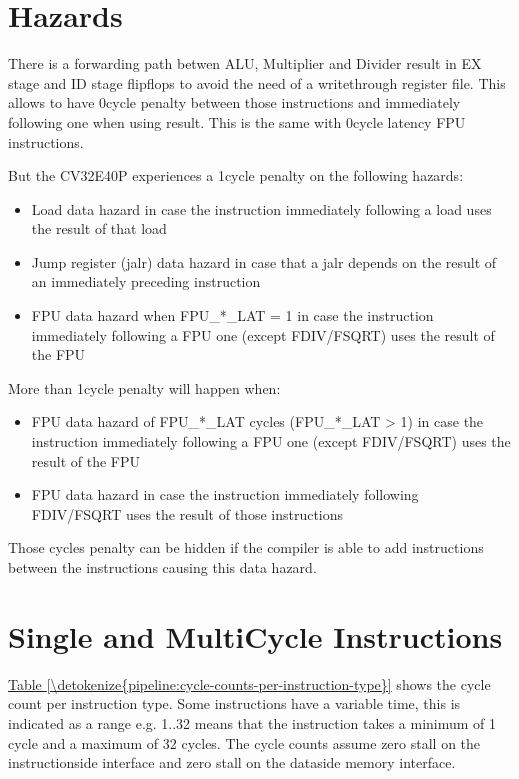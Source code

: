 \documentclass[letterpaper,10pt,english]{sphinxmanual}
\begin{document}
\section{Hazards}
\label{\detokenize{pipeline:hazards}}
\sphinxAtStartPar
There is a forwarding path betwen ALU, Multiplier and Divider result in EX stage and ID stage flip\sphinxhyphen{}flops to avoid the need of a write\sphinxhyphen{}through register file.
This allows to have 0\sphinxhyphen{}cycle penalty between those instructions and immediately following one when using result.
This is the same with 0\sphinxhyphen{}cycle latency FPU instructions.

\sphinxAtStartPar
But the CV32E40P experiences a 1\sphinxhyphen{}cycle penalty on the following hazards:
\begin{itemize}
\item {} 
\sphinxAtStartPar
Load data hazard in case the instruction immediately following a load uses the result of that load

\item {} 
\sphinxAtStartPar
Jump register (jalr) data hazard in case that a jalr depends on the result of an immediately preceding instruction

\item {} 
\sphinxAtStartPar
FPU data hazard when FPU\_*\_LAT = 1 in case the instruction immediately following a FPU one (except FDIV/FSQRT) uses the result of the FPU

\end{itemize}

\sphinxAtStartPar
More than 1\sphinxhyphen{}cycle penalty will happen when:
\begin{itemize}
\item {} 
\sphinxAtStartPar
FPU data hazard of FPU\_*\_LAT cycles (FPU\_*\_LAT \textgreater{} 1) in case the instruction immediately following a FPU one (except FDIV/FSQRT) uses the result of the FPU

\item {} 
\sphinxAtStartPar
FPU data hazard in case the instruction immediately following FDIV/FSQRT uses the result of those instructions

\end{itemize}

\sphinxAtStartPar
Those cycles penalty can be hidden if the compiler is able to add instructions between the instructions causing this data hazard.


\section{Single\sphinxhyphen{} and Multi\sphinxhyphen{}Cycle Instructions}
\label{\detokenize{pipeline:single-and-multi-cycle-instructions}}
\sphinxAtStartPar
\hyperref[\detokenize{pipeline:cycle-counts-per-instruction-type}]{Table \ref{\detokenize{pipeline:cycle-counts-per-instruction-type}}} shows the cycle count per instruction type. Some instructions have a variable time, this is indicated as a range e.g. 1..32 means that the instruction takes a minimum of 1 cycle and a maximum of 32 cycles.
The cycle counts assume zero stall on the instruction\sphinxhyphen{}side interface and zero stall on the data\sphinxhyphen{}side memory interface.
\end{document}

